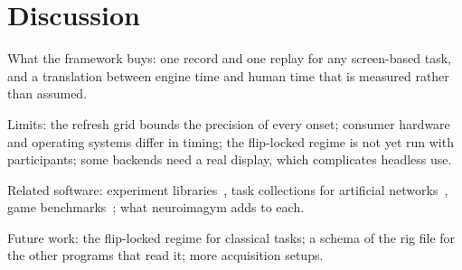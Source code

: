 \section{Discussion}
\label{sec:discussion}

\begin{outline}
  \item What the framework buys: one record and one replay for any screen-based task, and a translation between engine time and human time that is measured rather than assumed.
  \item Limits: the refresh grid bounds the precision of every onset; consumer hardware and operating systems differ in timing; the flip-locked regime is not yet run with participants; some backends need a real display, which complicates headless use.
  \item Related software: experiment libraries~\citep{peirce2019psychopy,pallier2026goxpyriment}, task collections for artificial networks~\citep{molanomazon2022neurogym}, game benchmarks~\citep{bellemare2013ale,kempka2016vizdoom,hafner2022crafter,samvelyan2021minihack,tomilin2023coom,cloos2024babaisai}; what neuroimagym adds to each.
  \item Future work: the flip-locked regime for classical tasks; a schema of the rig file for the other programs that read it; more acquisition setups.
\end{outline}
